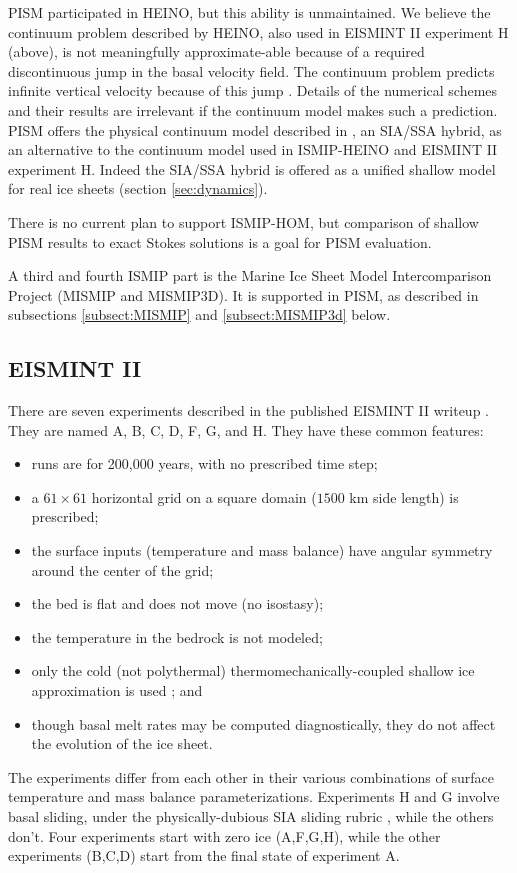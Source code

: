 PISM participated in HEINO, but this ability is unmaintained.   We believe the continuum problem described by HEINO, also used in EISMINT II experiment H (above), is not meaningfully approximate-able because of a required discontinuous jump in the basal velocity field.  The continuum problem predicts infinite vertical velocity because of this jump \cite[Appendix B]{BBssasliding}.  Details of the numerical schemes and their results are irrelevant if the continuum model makes such a prediction.  PISM offers the physical continuum model described in \cite{BBssasliding}, an SIA/SSA hybrid, as an alternative to the continuum model used in ISMIP-HEINO and EISMINT II experiment H.  Indeed the SIA/SSA hybrid is offered as a unified shallow model for real ice sheets (section \ref{sec:dynamics}).

There is no current plan to support ISMIP-HOM, but comparison of shallow PISM results to exact Stokes solutions is a goal for PISM evaluation.

A third and fourth ISMIP part is the Marine Ice Sheet Model Intercomparison Project (MISMIP and MISMIP3D).  It is supported in PISM, as described in subsections \ref{subsect:MISMIP} and \ref{subsect:MISMIP3d} below.


\subsection{EISMINT II}\label{subsect:EISMINTII}

There are seven experiments described in the published EISMINT II writeup \cite{EISMINT00}.  They are named A, B, C, D, F, G, and H.  They have these common features:\begin{itemize}
\item runs are for 200,000 years, with no prescribed time step;
\item a $61\times 61$ horizontal grid on a square domain ($1500$ km side length) is prescribed;
\item the surface inputs (temperature and mass balance) have angular symmetry around the center of the grid;
\item the bed is flat and does not move (no isostasy);
\item the temperature in the bedrock is not modeled;
\item only the cold (not polythermal) thermomechanically-coupled shallow ice approximation is used \cite{EISMINT00}; and
\item though basal melt rates may be computed diagnostically, they do not affect the evolution of the ice sheet.
\end{itemize}
The experiments differ from each other in their various combinations of surface temperature and mass balance parameterizations.  Experiments H and G involve basal sliding, under the physically-dubious SIA sliding rubric \cite[Appendix B]{BBssasliding}, while the others don't.  Four experiments start with zero ice (A,F,G,H), while the other experiments (B,C,D) start from the final state of experiment A.


